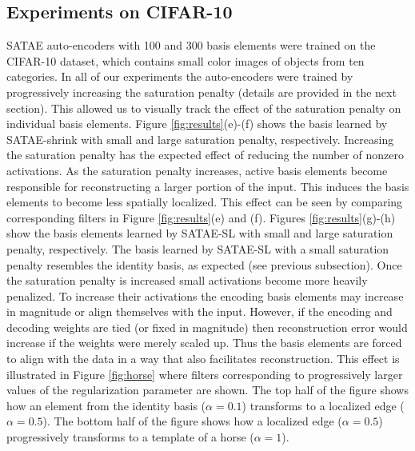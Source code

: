 \subsection{Experiments on CIFAR-10} SATAE auto-encoders with 100 and 300 basis
elements were trained on the CIFAR-10 dataset, which contains small color
images of objects from ten categories. In all of our experiments the
auto-encoders were trained by progressively increasing the saturation penalty
(details are provided in the next section). This allowed us to visually track
the effect of the saturation penalty on individual basis elements. Figure
\ref{fig:results}(e)-(f) shows the basis learned by SATAE-shrink with small and
large saturation penalty, respectively. Increasing the saturation penalty has
the expected effect of reducing the number of nonzero activations. As the
saturation penalty increases, active basis elements become responsible for
reconstructing a larger portion of the input. This induces the basis elements
to become less spatially localized. This effect can be seen by comparing
corresponding filters in Figure \ref{fig:results}(e) and (f). Figures
\ref{fig:results}(g)-(h)  show the basis elements learned by SATAE-SL with
small and large saturation penalty, respectively. The basis learned by SATAE-SL
with a small saturation penalty resembles the identity basis, as expected (see
previous subsection). Once the saturation penalty is increased small
activations become more heavily penalized. To increase their activations the
encoding basis elements may increase in magnitude or align themselves with the
input. However, if the encoding and decoding weights are tied (or fixed in
magnitude) then reconstruction error would increase if the weights were merely
scaled up. Thus the basis elements are forced to align with the data in a way
that also facilitates reconstruction. This effect is illustrated in Figure
\ref{fig:horse} where filters corresponding to progressively larger values of
the regularization parameter are shown. The top half of the figure shows how an
element from the identity basis ($\alpha=0.1$) transforms to a localized edge
($\alpha=0.5$). The bottom half of the figure shows how a localized edge
($\alpha=0.5$) progressively transforms to a template of a horse ($\alpha=1$).

